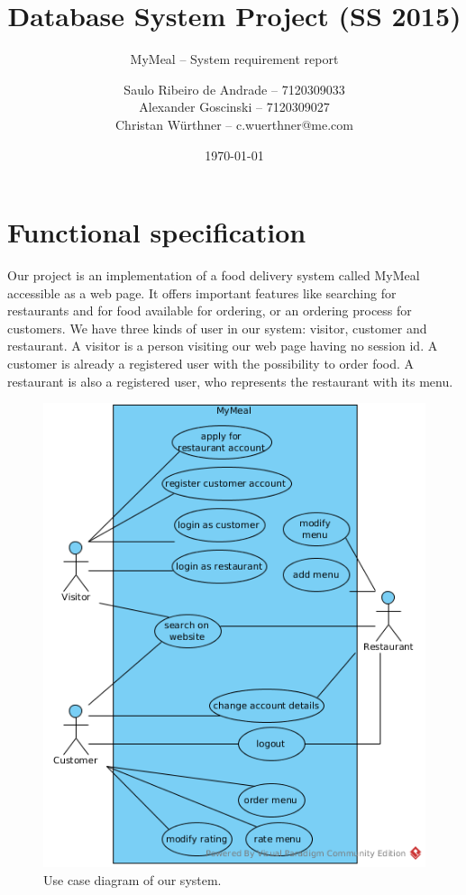 \documentclass[parskip=half, a4paper, DIV=14]{scrartcl}
\begin{document}
\title{Database System Project (SS 2015)}
\subtitle{MyMeal -- System requirement report}
\author{Saulo Ribeiro de Andrade -- 7120309033\\
		Alexander Goscinski -- 7120309027\\
		Christan Würthner -- c.wuerthner@me.com}
\date{\today}
\maketitle


\section{Functional specification}
Our project is an implementation of a food delivery system called MyMeal accessible as
a web page. It offers important features like 
searching for restaurants and for food available for ordering, or an ordering
process for customers. We have three kinds of user in our system: visitor, customer and restaurant.
A visitor is a person visiting our web page having no session id. A customer is already a
registered user with the possibility to order food. A restaurant is also a
registered user, who represents the restaurant with its menu.

\begin{figure}[hb]
	\centering
		\includegraphics[scale=0.7]{UseCaseDiagramHunger.png}
	\caption{Use case diagram of our system.}
\end{figure}
\end{document}
